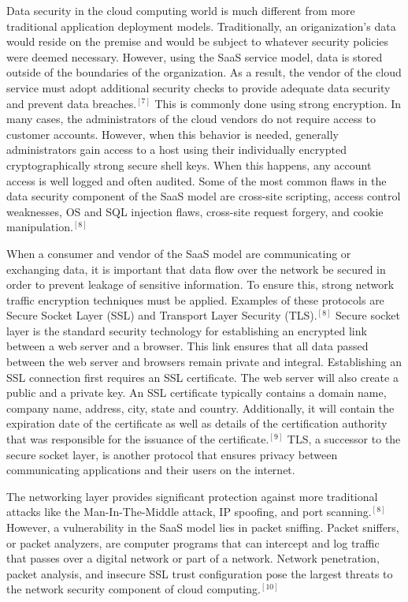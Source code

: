 \documentclass[a4paper, 8pt]{article} %
\begin{document}
\begin{doublespacing}
Data security in the cloud computing world is much different from more traditional application deployment models.  Traditionally, an origanization's data would reside on the premise and would be subject to whatever security policies were deemed necessary.  However, using the SaaS service model, data is stored outside of the boundaries of the organization.  As a result, the vendor of the cloud service must adopt additional security checks to provide adequate data security and prevent data breaches.$^{[7]}$  This is commonly done using strong encryption.  In many cases, the administrators of the cloud vendors do not require access to customer accounts.  However, when this behavior is needed, generally administrators gain access to a host using their individually encrypted cryptographically strong secure shell keys.  When this happens, any account access is well logged and often audited.  Some of the most common flaws in the data security component of the SaaS model are cross-site scripting, access control weaknesses, OS and SQL injection flaws, cross-site request forgery, and cookie manipulation.$^{[8]}$  

When a consumer and vendor of the SaaS model are communicating or exchanging data, it is important that data flow over the network be secured in order to prevent leakage of sensitive information.  To ensure this, strong network traffic encryption techniques must be applied.  Examples of these protocols are Secure Socket Layer (SSL) and Transport Layer Security (TLS).$^{[8]}$  Secure socket layer is the standard security technology for establishing an encrypted link between a web server and a browser.  This link ensures that all data passed between the web server and browsers remain private and integral.  Establishing an SSL connection first requires an SSL certificate.  The web server will also create a public and a private key.  An SSL certificate typically contains a domain name, company name, address, city, state and country.  Additionally, it will contain the expiration date of the certificate as well as details of the certification authority that was responsible for the issuance of the certificate.$^{[9]}$  TLS, a successor to the secure socket layer, is another protocol that ensures privacy between communicating applications and their users on the internet.  

The networking layer provides significant protection against more traditional attacks like the Man-In-The-Middle attack, IP spoofing, and port scanning.$^{[8]}$  However, a vulnerability in the SaaS model lies in packet sniffing.  Packet sniffers, or packet analyzers, are computer programs that can intercept and log traffic that passes over a digital network or part of a network.  Network penetration, packet analysis, and insecure SSL trust configuration pose the largest threats to the network security component of cloud computing.$^{[10]}$  


\end{doublespacing}
\end{document}
